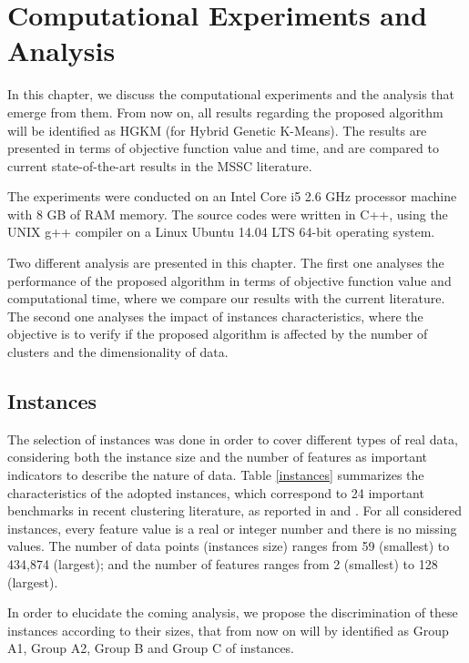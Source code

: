 \chapter{Computational Experiments and Analysis}
\label{chap:experiments}
In this chapter, we discuss the computational experiments and the analysis that emerge from them. From now on, all results regarding the proposed algorithm will be identified as HGKM (for Hybrid Genetic K-Means). The results are presented in terms of objective function value and time, and are compared to current state-of-the-art results in the MSSC literature.

The experiments were conducted on an Intel Core i5 2.6 GHz processor machine with 8 GB of RAM memory. The source codes were written in C++, using the UNIX g++ compiler on a Linux Ubuntu 14.04 LTS 64-bit operating system.

Two different analysis are presented in this chapter. The first one analyses the performance of the proposed algorithm in terms of objective function value and computational time, where we compare our results with the current literature. The second one analyses the impact of instances characteristics, where the objective is to verify if the proposed algorithm is affected by the number of clusters and the dimensionality of data.

\section{Instances}
\label{sec:instances}
The selection of instances was done in order to cover different types of real data, considering both the instance size and the number of features as important indicators to describe the nature of data. Table \ref{instances} summarizes the characteristics of the adopted instances, which correspond to 24 important benchmarks in recent clustering literature, as reported in \cite{Ordin2014} and \cite{Bagirov2016}. For all considered instances, every feature value is a real or integer number and there is no missing values. The number of data points (instances size) ranges from 59 (smallest) to 434,874 (largest); and the number of features ranges from 2 (smallest) to 128 (largest).



In order to elucidate the coming analysis, we propose the discrimination of these instances according to their sizes, that from now on will by identified as Group A1, Group A2, Group B and Group C of instances.

